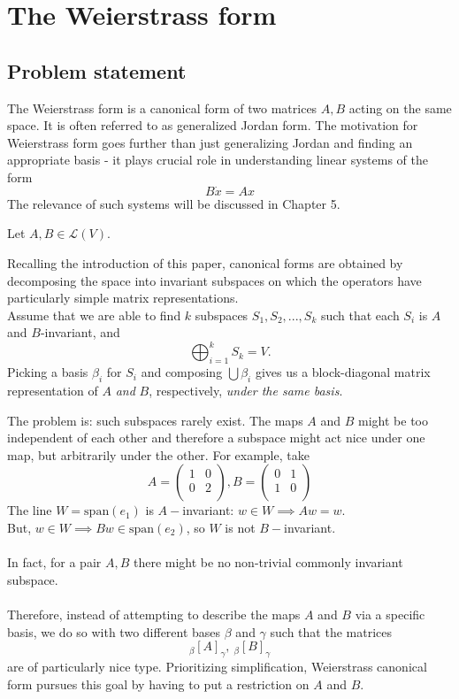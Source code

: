 \section{The Weierstrass form} \label{section:weierstrass}
\subsection{Problem statement}
The Weierstrass form is a canonical form of two matrices $A,B$ acting on the same space.
It is often referred to as generalized Jordan form. The motivation for Weierstrass form goes further than just generalizing Jordan and finding an appropriate basis - it plays crucial role in understanding linear systems of the form $$B\dot{x}=Ax$$
The relevance of such systems will be discussed in Chapter 5.

Let $A,B\in \mathcal{L}(V).$

Recalling the introduction of this paper, canonical forms are obtained by decomposing the space into invariant subspaces on which the operators have particularly simple matrix representations.\\
Assume that we are able to find $k$ subspaces $S_1,S_2,...,S_k$ such that each $S_i$ is $A$ and $B$-invariant, and $$\bigoplus_{i=1}^k S_k=V.$$Picking a basis $\beta_i$ for $S_i$ and composing $\bigcup\beta_i$ gives us a block-diagonal matrix representation of $A$ \textit{and} $B$, respectively, \textit{under the same basis}.

The problem is: such subspaces rarely exist. The maps $A$ and $B$ might be too independent of each other and therefore a subspace might act nice under one map, but arbitrarily under the other. For example, take
\[
	A=
	\begin{pmatrix}
		1  & 0         \\
		0  & 2  \\


	\end{pmatrix}
    ,
    B=
	\begin{pmatrix}
		0  & 1        \\
		1  & 0  \\


	\end{pmatrix}
\]
The line $W=\text{span}(e_1)$ is $A-$invariant: $w\in W \implies Aw=w.$\\
But, $w\in W\implies Bw\in \text{span}(e_2)$, so $W$ is not $B-$invariant.\\ \\
In fact, for a pair $A,B$ there might be no non-trivial commonly invariant subspace.\\ \\
Therefore, instead of attempting to describe the maps $A$ and $B$ via a specific basis, we do so with two different  bases $\beta$ and $\gamma$ such that the matrices
\begin{equation}\label{form}
    _\beta[A]_ \gamma,\ _\beta[B]_ \gamma
\end{equation}
are of particularly nice type.
Prioritizing simplification, Weierstrass canonical form pursues this goal by having to put a restriction on $A$ and $B$.

